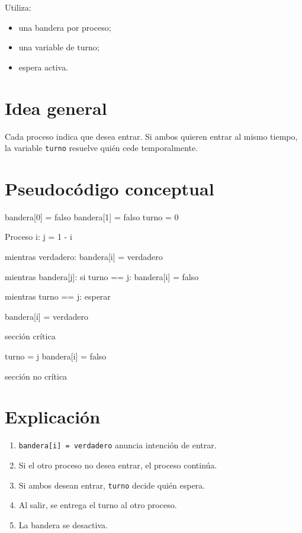 \documentclass[
  spanish,
  letterpaper,
]{scrbook}
\newenvironment{Shaded}{\begin{snugshade}}{\end{snugshade}}
\newcommand{\NormalTok}[1]{\textcolor[rgb]{0.00,0.23,0.31}{#1}}
\providecommand{\tightlist}{%
  \setlength{\itemsep}{0pt}\setlength{\parskip}{0pt}}
\begin{document}
Utiliza:

\begin{itemize}
\tightlist
\item
  una bandera por proceso;
\item
  una variable de turno;
\item
  espera activa.
\end{itemize}

\section{Idea general}\label{idea-general}

Cada proceso indica que desea entrar. Si ambos quieren entrar al mismo
tiempo, la variable \texttt{turno} resuelve quién cede temporalmente.

\section{Pseudocódigo conceptual}\label{pseudocuxf3digo-conceptual}

\begin{Shaded}
\begin{Highlighting}[]
\NormalTok{bandera[0] = falso}
\NormalTok{bandera[1] = falso}
\NormalTok{turno = 0}

\NormalTok{Proceso i:}
\NormalTok{    j = 1 {-} i}

\NormalTok{    mientras verdadero:}
\NormalTok{        bandera[i] = verdadero}

\NormalTok{        mientras bandera[j]:}
\NormalTok{            si turno == j:}
\NormalTok{                bandera[i] = falso}

\NormalTok{                mientras turno == j:}
\NormalTok{                    esperar}

\NormalTok{                bandera[i] = verdadero}

\NormalTok{        sección crítica}

\NormalTok{        turno = j}
\NormalTok{        bandera[i] = falso}

\NormalTok{        sección no crítica}
\end{Highlighting}
\end{Shaded}

\section{Explicación}\label{explicaciuxf3n}

\begin{enumerate}
\def\labelenumi{\arabic{enumi}.}
\tightlist
\item
  \texttt{bandera{[}i{]}\ =\ verdadero} anuncia intención de entrar.
\item
  Si el otro proceso no desea entrar, el proceso continúa.
\item
  Si ambos desean entrar, \texttt{turno} decide quién espera.
\item
  Al salir, se entrega el turno al otro proceso.
\item
  La bandera se desactiva.
\end{enumerate}
\end{document}
